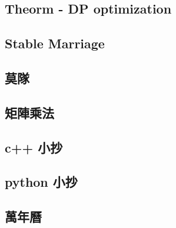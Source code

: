 \subsection{Theorm - DP optimization}

\subsection{Stable Marriage}

\subsection{莫隊}

\subsection{矩陣乘法}

\subsection{c++ 小抄}

\subsection{python 小抄}

\subsection{萬年曆}


